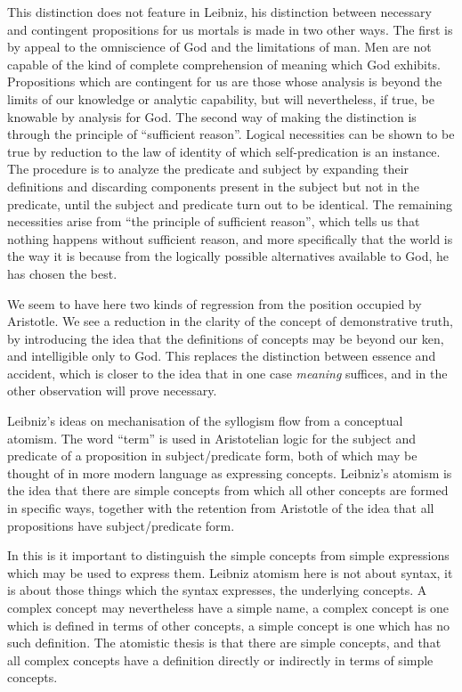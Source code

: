 This distinction does not feature in Leibniz, his distinction between necessary and contingent propositions for us mortals is made in two other ways.
The first is by appeal to the omniscience of God and the limitations of man.
Men are not capable of the kind of complete comprehension of meaning which God exhibits.
Propositions which are contingent for us are those whose analysis is beyond the limits of our knowledge or analytic capability, but will nevertheless, if true, be knowable by analysis for God.
The second way of making the distinction is through the principle of ``sufficient reason''.
Logical necessities can be shown to be true by reduction to the law of identity of which self-predication is an instance.
The procedure is to analyze the predicate and subject by expanding their definitions and discarding components present in the subject but not in the predicate, until the subject and predicate turn out to be identical.
The remaining necessities arise from ``the principle of sufficient reason'', which tells us that nothing happens without sufficient reason, and more specifically that the world is the way it is because from the logically possible alternatives available to God, he has chosen the best.

We seem to have here two kinds of regression from the position occupied by Aristotle.
We see a reduction in the clarity of the concept of demonstrative truth, by introducing the idea that the definitions of concepts may be beyond our ken, and intelligible only to God.
This replaces the distinction between essence and accident, which is closer to the idea that in one case \emph{meaning} suffices, and in the other observation will prove necessary.

Leibniz's ideas on mechanisation of the syllogism flow from a conceptual atomism.
The word ``term'' is used in Aristotelian logic for the subject and predicate of a proposition in subject/predicate form, both of which may be thought of in more modern language as expressing concepts.
Leibniz's atomism is the idea that there are simple concepts from which all other concepts are formed in specific ways, together with the retention from Aristotle of the idea that all propositions have subject/predicate form.

In this is it important to distinguish the simple concepts from simple expressions which may be used to express them.
Leibniz atomism here is not about syntax, it is about those things which the syntax expresses, the underlying concepts.
A complex concept may nevertheless have a simple name, a complex concept is one which is defined in terms of other concepts, a simple concept is one which has no such definition.
The atomistic thesis is that there are simple concepts, and that all complex concepts have a definition directly or indirectly in terms of simple concepts.

